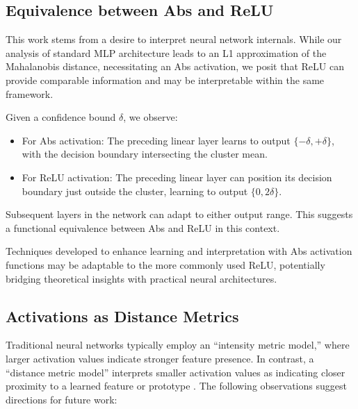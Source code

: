 \subsection{Equivalence between Abs and ReLU}

This work stems from a desire to interpret neural network internals. While our analysis of standard MLP architecture leads to an L1 approximation of the Mahalanobis distance, necessitating an Abs activation, we posit that ReLU can provide comparable information and may be interpretable within the same framework.

Given a confidence bound $\delta$, we observe:

\begin{itemize}
    \item For Abs activation: The preceding linear layer learns to output $\{-\delta, +\delta\}$, with the decision boundary intersecting the cluster mean.
    \item For ReLU activation: The preceding linear layer can position its decision boundary just outside the cluster, learning to output $\{0, 2\delta\}$.
\end{itemize}

Subsequent layers in the network can adapt to either output range. This suggests a functional equivalence between Abs and ReLU in this context.

Techniques developed to enhance learning and interpretation with Abs activation functions may be adaptable to the more commonly used ReLU, potentially bridging theoretical insights with practical neural architectures.

\subsection{Activations as Distance Metrics}

Traditional neural networks typically employ an ``intensity metric model,'' where larger activation values indicate stronger feature presence. In contrast, a ``distance metric model'' interprets smaller activation values as indicating closer proximity to a learned feature or prototype \citep{broomhead1988radial}. The following observations suggest directions for future work:

